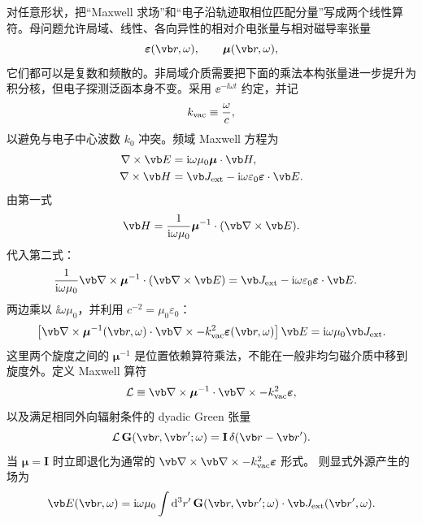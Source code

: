 对任意形状，把“Maxwell 求场”和“电子沿轨迹取相位匹配分量”写成两个线性算符。母问题允许局域、线性、各向异性的相对介电张量与相对磁导率张量
\begin{equation}
 \boldsymbol\varepsilon(\vb r,\omega),
 \qquad
 \boldsymbol\mu(\vb r,\omega),
\end{equation}
它们都可以是复数和频散的。非局域介质需要把下面的乘法本构张量进一步提升为积分核，但电子探测泛函本身不变。采用 $\ee^{-\ii\omega t}$ 约定，并记
\begin{equation}
k_{\rm vac}\equiv\frac{\omega}{c},
\end{equation}
以避免与电子中心波数 $k_0$ 冲突。频域 Maxwell 方程为
\begin{align}
\nabla\times\vb E
&=\ii\omega\mu_0\boldsymbol\mu\cdot\vb H,
\label{eq:maxwell-curl-E-general}\\
\nabla\times\vb H
&=\vb J_{\rm ext}
-\ii\omega\varepsilon_0\boldsymbol\varepsilon\cdot\vb E.
\label{eq:maxwell-curl-H-general}
\end{align}
由第一式
\begin{equation}
 \vb H
 =\frac{1}{\ii\omega\mu_0}
 \boldsymbol\mu^{-1}\cdot(\vb\nabla\times\vb E).
\end{equation}
代入第二式：
\begin{align}
\frac{1}{\ii\omega\mu_0}
\vb\nabla\times
\boldsymbol\mu^{-1}\cdot(\vb\nabla\times\vb E)
&=\vb J_{\rm ext}
-\ii\omega\varepsilon_0\boldsymbol\varepsilon\cdot\vb E.
\end{align}
两边乘以 $\ii\omega\mu_0$，并利用 $c^{-2}=\mu_0\varepsilon_0$：
\begin{equation}
 {
 \left[
 \vb\nabla\times\boldsymbol\mu^{-1}(\vb r,\omega)\cdot\vb\nabla\times
 -k_{\rm vac}^2\boldsymbol\varepsilon(\vb r,\omega)
 \right]\vb E
 =\ii\omega\mu_0\vb J_{\rm ext}.}
 \label{eq:Maxwell_general}
\end{equation}
这里两个旋度之间的 $\boldsymbol\mu^{-1}$ 是位置依赖算符乘法，不能在一般非均匀磁介质中移到旋度外。定义 Maxwell 算符
\begin{equation}
 \mathcal L
 \equiv
 \vb\nabla\times\boldsymbol\mu^{-1}\cdot\vb\nabla\times
 -k_{\rm vac}^2\boldsymbol\varepsilon,
 \label{eq:general-maxwell-operator}
\end{equation}
以及满足相同外向辐射条件的 dyadic Green 张量
\begin{equation}
{
\mathcal L\,\mathbf G(\vb r,\vb r';\omega)
=\mathbf I\,\delta(\vb r-\vb r').}
\label{eq:dyadicGreenDef}
\end{equation}
当 $\boldsymbol\mu=\mathbf I$ 时立即退化为通常的
$\vb\nabla\times\vb\nabla\times-k_{\rm vac}^2\boldsymbol\varepsilon$ 形式。
则显式外源产生的场为
\begin{equation}
{
\vb E(\vb r,\omega)
=\ii\omega\mu_0
\int\dd^3r'\,\mathbf G(\vb r,\vb r';\omega)\cdot\vb J_{\rm ext}(\vb r',\omega).}
\label{eq:E_GJ}
\end{equation}



